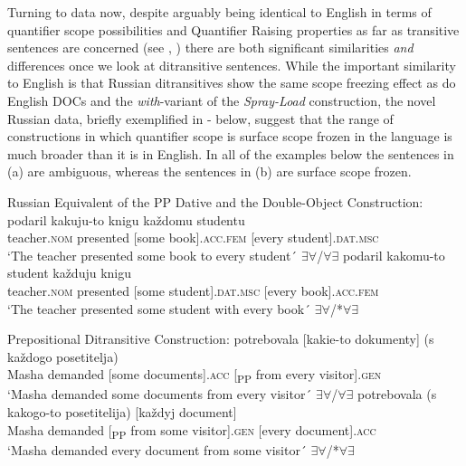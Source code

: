 \documentclass[output=paper,colorlinks,citecolor=brown]{./langscibook}
\begin{document}
Turning to data now, despite arguably being identical to English in terms of quantifier scope possibilities and Quantifier Raising properties as far as transitive sentences are concerned (see \citealt{Antonyuk-Yudina2006, Antonyuk2015}, \citeyear{Antonyuk2019}) there are both significant similarities \textit{and} differences once we look at ditransitive sentences. While the important similarity to English is that Russian ditransitives show the same scope freezing effect as do English DOCs and the \textit{with}-variant of the \textit{Spray-Load} construction, the novel Russian data, briefly exemplified in - below, suggest that the range of constructions in which quantifier scope is surface scope frozen in the language is much broader than it is in English. In all of the examples below the sentences in (a) are ambiguous, whereas the sentences in (b) are surface scope frozen.

\ea%
    \label{ex:antonyuk:2}
    Russian Equivalent of the PP Dative and the Double-Object Construction:
    \ea \label{ex:antonyuk:2a}
         {podaril}      {kakuju-to}   {knigu}    {každomu} {studentu}\\
    teacher.\textsc{nom} presented [some   book].\textsc{acc.fem}  [every student].\textsc{dat.msc}\\
    \glt `The teacher presented some book to every student´ \hfill ${\exists}{\forall}$/${\forall}{\exists}$
    \ex \label{ex:antonyuk:2b}
              {podaril}      {kakomu-to} {student}     {každuju} {knigu}\\
    teacher.\textsc{nom} presented [some         student].\textsc{dat.msc}   [every book].\textsc{acc.fem}\\
    \glt `The teacher presented some student with every book´ \hfill ${\exists}{\forall}$/*${\forall}{\exists}$
    \z
\z

\ea%
    \label{ex:antonyuk:3}
    Prepositional Ditransitive Construction:
    \ea \label{ex:antonyuk:3a}
       {potrebovala}  {[kakie-to} {dokumenty]}  {}   {(s}  {každogo}  posetitelja)\\
    Masha demanded     [some documents].\textsc{acc} [\textsubscript{PP} from every visitor].\textsc{gen}\\
    \glt `Masha demanded some documents from every visitor´ \hfill ${\exists}{\forall}$/${\forall}{\exists}$
    \ex \label{ex:antonyuk:3b}
       {potrebovala} {}   {(s} {kakogo-to} {posetitelija)} {[každyj} {document]}\\
    Masha demanded [\textsubscript{PP} from some   visitor].\textsc{gen} [every document].\textsc{acc}\\
    \glt `Masha demanded every document from some visitor´ \hfill ${\exists}{\forall}$/*${\forall}{\exists}$
    \z
\z
\end{document}
